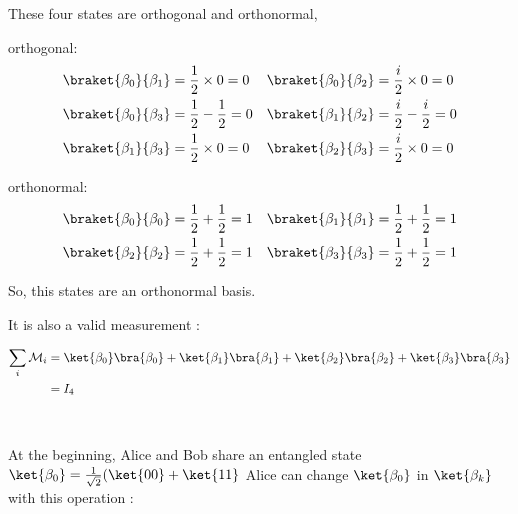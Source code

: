 These four states are orthogonal and orthonormal,

orthogonal:
\begin{align*}
  \braket{\beta_0}{\beta_1} &= \frac 1 2 \times 0 = 0 &
  \braket{\beta_0}{\beta_2} &= \frac i 2 \times 0 = 0 \\
  \braket{\beta_0}{\beta_3} &= \frac 1 2 - \frac 1 2 = 0 &
  \braket{\beta_1}{\beta_2} &= \frac i 2 - \frac i 2 = 0 \\
  \braket{\beta_1}{\beta_3} &= \frac 1 2 \times 0 = 0 &
  \braket{\beta_2}{\beta_3} &= \frac i 2 \times 0 = 0
\end{align*}

orthonormal:
\begin{align*}
  \braket{\beta_0}{\beta_0} &= \frac 1 2 + \frac 1 2 = 1 &
  \braket{\beta_1}{\beta_1} &= \frac 1 2 + \frac 1 2 = 1 \\
  \braket{\beta_2}{\beta_2} &= \frac 1 2 + \frac 1 2 = 1 &
  \braket{\beta_3}{\beta_3} &= \frac 1 2 + \frac 1 2 = 1 \\
\end{align*}

So, this states are an orthonormal basis.

It is also a valid measurement :

\begin{align*}
  \sum_i \mathcal M _i &=
  \ket {\beta_0} \bra {\beta_0} + \ket {\beta_1} \bra {\beta_1} +
  \ket {\beta_2} \bra {\beta_2} + \ket {\beta_3} \bra {\beta_3} \\
  &= I_4
\end{align*}

~

At the beginning, Alice and Bob share an entangled state $\ket{\beta_0} = \frac
1 {\sqrt 2}(\ket{00} + \ket{11}$ Alice can change $\ket{\beta_0}$ in $\ket
{\beta_k}$ with this operation :

